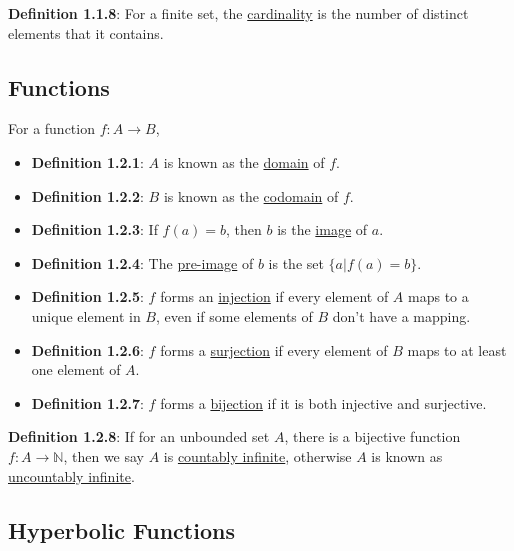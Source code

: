 \documentclass{article}
\newcommand{\separate}[1] {\vspace{#1 pt}\noindent}
\newcommand{\N}{\mathbb{N}}
\newcommand{\definition}[2]{\textbf{Definition #1}: #2\label{def:#1}}
\begin{document}
\separate{7}\definition{1.1.8}{For a finite set, the \underline{cardinality} is the number of distinct elements that it contains.}

\subsection{Functions}

\separate{7}For a function \(f: A \rightarrow B\),
\begin{itemize}
    \item \definition{1.2.1}{\(A\) is known as the \underline{domain} of \(f\).}
    \item \definition{1.2.2}{\(B\) is known as the \underline{codomain} of \(f\).}
    \item \definition{1.2.3}{If \(f(a)=b\), then \(b\) is the \underline{image} of \(a\).}
    \item \definition{1.2.4}{The \underline{pre-image} of \(b\) is the set \(\{a|f(a)=b\}\).}
    \item \definition{1.2.5}{\(f\) forms an \underline{injection} if every element of \(A\) maps to a unique element in \(B\), even if some elements of \(B\) don't have a mapping.}
    \item \definition{1.2.6}{\(f\) forms a \underline{surjection} if every element of \(B\) maps to at least one element of \(A\).}
    \item \definition{1.2.7}{\(f\) forms a \underline{bijection} if it is both injective and surjective.}
\end{itemize}

\separate{7}\definition{1.2.8}{If for an unbounded set \(A\), there is a bijective function \(f: A \rightarrow \N\), then we say \(A\) is \underline{countably infinite}, otherwise \(A\) is known as \underline{uncountably infinite}.}

\subsection{Hyperbolic Functions}
\end{document}
